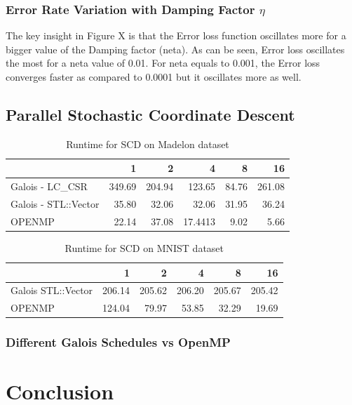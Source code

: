 \documentclass{sigplanconf}
\begin{document}
	\subsubsection{Error Rate Variation with Damping Factor \(\eta\) }
	The key insight in Figure X is that the Error loss function oscillates more for a bigger value of the Damping factor (neta).
	As can be seen, Error loss oscillates the most for a neta value of 0.01. For neta equals to 0.001, the Error loss converges faster
	as compared to 0.0001 but it oscillates more as well.

\subsection{Parallel Stochastic Coordinate Descent}
\begin{table}[htbp]
\caption{Runtime for SCD on Madelon dataset}
\begin{tabular}{|l|r|r|r|r|r|}
\hline
 & 1 & 2 & 4 & 8 & 16 \\ \hline
Galois - LC\_CSR & 349.69 & 204.94 & 123.65 & 84.76 & 261.08 \\ \hline
Galois - STL::Vector  & 35.80 & 32.06 & 32.06 & 31.95 & 36.24 \\ \hline
OPENMP & 22.14 & 37.08 & 17.4413 & 9.02 & 5.66 \\ \hline
\end{tabular}
\label{Label of the table}
\end{table}

\begin{table}[htbp]
\caption{Runtime for SCD on MNIST dataset}
\begin{tabular}{|l|r|r|r|r|r|}
\hline
 & 1 & 2 & 4 & 8 & 16 \\ \hline
Galois STL::Vector & 206.14 & 205.62 & 206.20 & 205.67 & 205.42 \\ \hline
OPENMP & 124.04 & 79.97 & 53.85 & 32.29 & 19.69 \\ \hline
\end{tabular}
\label{Label of the table}
\end{table}

\subsubsection{Different Galois Schedules vs OpenMP}

\section{Conclusion}
\end{document}
